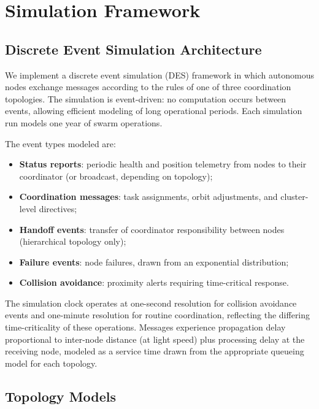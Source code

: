 \documentclass[journal]{IEEEtran}
\begin{document}
\section{Simulation Framework}

\subsection{Discrete Event Simulation Architecture}

We implement a discrete event simulation (DES) framework in which autonomous nodes exchange messages according to the rules of one of three coordination topologies. The simulation is event-driven: no computation occurs between events, allowing efficient modeling of long operational periods. Each simulation run models one year of swarm operations.

The event types modeled are:
\begin{itemize}
    \item \textbf{Status reports}: periodic health and position telemetry from nodes to their coordinator (or broadcast, depending on topology);
    \item \textbf{Coordination messages}: task assignments, orbit adjustments, and cluster-level directives;
    \item \textbf{Handoff events}: transfer of coordinator responsibility between nodes (hierarchical topology only);
    \item \textbf{Failure events}: node failures, drawn from an exponential distribution;
    \item \textbf{Collision avoidance}: proximity alerts requiring time-critical response.
\end{itemize}

The simulation clock operates at one-second resolution for collision avoidance events and one-minute resolution for routine coordination, reflecting the differing time-criticality of these operations. Messages experience propagation delay proportional to inter-node distance (at light speed) plus processing delay at the receiving node, modeled as a service time drawn from the appropriate queueing model for each topology.

\subsection{Topology Models}
\end{document}
